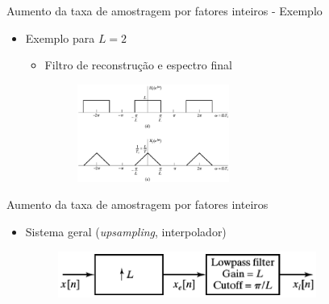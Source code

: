 \begin{slide}{Aumento da taxa de amostragem por fatores inteiros - Exemplo}
	\begin{itemize}
		\item Exemplo para $L=2$
			\begin{itemize}
		\item Filtro de reconstrução e espectro final 
			\begin{figure}
				\centering
				\includegraphics[width=0.5\textwidth]{figs/4-24de.eps}
		        \end{figure}
			\end{itemize}
	\end{itemize}
\end{slide} 
\begin{slide}{Aumento da taxa de amostragem por fatores inteiros}
	\begin{itemize}
		\item Sistema geral (\emph{upsampling}, interpolador) 
			\begin{figure}
				\centering
				\includegraphics[width=0.8\textwidth]{figs/4-23.eps}
		        \end{figure}
	\end{itemize}
\end{slide} 

